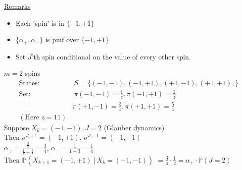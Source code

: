 \documentclass[12pt, letterpaper]{article}
\begin{document}
\noindent\underline{Remarks}
\begin{itemize}
    \item Each 'spin' is in $\{-1, +1\}$
    \item $\{\alpha_+, \alpha_-\}$ is pmf over $\{-1,+1\}$
    \item Set $J$'th spin conditional on the value of every other spin.
\end{itemize}

\noindent{} $m = 2$ spins
\begin{align*}
    \text{States}: &\ S = \{(-1, -1),(-1, +1),(+1, -1),(+1, +1), \} \\
    \text{Set}: & \ \pi(-1,-1) = \frac 1z, \pi(-1,+1) = \frac 2z \\
    & \pi(+1, -1) = \frac 3z, \pi(+1, +1) = \frac 5z \\
    (\text{Here } z = 11)
\end{align*}
Suppose $X_k = (-1,-1), J=2$ (Glauber dynamics) \\
Then $\sigma^{J, +1} = (-1,+1)$, $\sigma^{J, -1}=(-1,-1)$ \\
$\alpha_+ = \frac{\frac 3z}{ \frac 1z + \frac 3z} = \frac 34$, $\alpha_- = \frac{1}{1+3} = \frac 14$ \\
Then $\mathbb{P}(X_{k+1}=(-1,+1)\ |\ X_k = (-1,-1))$
$= \frac 34 \cdot \frac 12 = \alpha_+ \cdot \mathbb{P}(J=2)$
\end{document}
